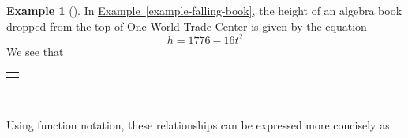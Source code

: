 \documentclass[10pt,]{book}
\theoremstyle{plain}
\theoremstyle{definition}
\theoremstyle{definition}
\theoremstyle{definition}
\newtheorem{example}[theorem]{Example}
\theoremstyle{definition}
\numberwithin{equation}{section}
\newlength{\panelmax}
\begin{document}
\begin{example}[]\label{example-falling-book-2}
\hypertarget{p-49}{}%
In \hyperref[example-falling-book]{Example~\ref{example-falling-book}}, the height of an algebra book dropped from the top of One World Trade Center is given by the equation%
\begin{equation*}
h = 1776 - 16t^2
\end{equation*}
We see that%
\par
\hypertarget{p-50}{}%
{%
\setlength{\panelmax}{0pt}
\ifdefined\panelboxAtabular\else\newsavebox{\panelboxAtabular}\fi%
\ifdefined\phAtabular\else\newlength{\phAtabular}\fi%
\setlength{\phAtabular}{\ht\panelboxAtabular+\dp\panelboxAtabular}
\settototalheight{\phAtabular}{\usebox{\panelboxAtabular}}
\setlength{\panelmax}{\maxof{\panelmax}{\phAtabular}}
\leavevmode%
\setlength{\tabcolsep}{0\linewidth}
\par\medskip\noindent
\begin{tabular}{@{}*{1}{c}@{}}
\begin{minipage}[c][\panelmax][t]{1\linewidth}\usebox{\panelboxAtabular}\end{minipage}\end{tabular}\\
}%
%
\par
\hypertarget{p-51}{}%
Using function notation, these relationships can be expressed more concisely as%
\par
\hypertarget{p-52}{}%
{%
\setlength{\panelmax}{0pt}
\ifdefined\panelboxAtabular\else\newsavebox{\panelboxAtabular}\fi%
}
\end{example}
\end{document}
